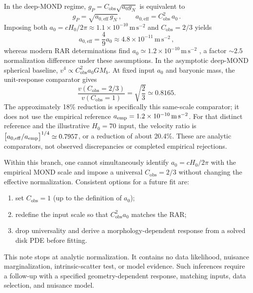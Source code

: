 \documentclass[aps,prd,reprint,superscriptaddress,nofootinbib,floatfix,showkeys]{revtex4-2}
\newcommand{\Cobs}{C_{\mathrm{obs}}}
\newcommand{\azero}{a_{0}}
\newcommand{\Hzero}{H_{0}}
\begin{document}
In the deep-MOND regime, \(g_{P}=\Cobs\sqrt{\azero g_{N}}\) is equivalent to
\begin{equation}
  g_{P}=\sqrt{a_{0,\mathrm{eff}}\,g_{N}}\,,
  \qquad
  a_{0,\mathrm{eff}} = \Cobs^{2}\,\azero\,.
  \label{eq:a0eff}
\end{equation}
Imposing both \(\azero=c\Hzero/2\pi\approx 1.1\times 10^{-10}\,\mathrm{m\,s^{-2}}\)
and \(\Cobs=2/3\) yields
\begin{equation}
  a_{0,\mathrm{eff}} = \frac{4}{9}\azero
  \approx 4.8\times 10^{-11}\,\mathrm{m\,s^{-2}}\,,
  \label{eq:a0eff-num}
\end{equation}
whereas modern RAR determinations find
\(a_0\simeq 1.2\times 10^{-10}\,\mathrm{m\,s^{-2}}\)
\cite{mcgaugh_rar,lelli_rar}, a factor \(\sim 2.5\) normalization difference
under these assumptions.
In the asymptotic deep-MOND spherical baseline,
\(v^{4}\propto \Cobs^{2}\azero GM_{b}\). At fixed input \(\azero\) and
baryonic mass, the unit-response comparator gives
\begin{equation}
 \frac{v(\Cobs=2/3)}{v(\Cobs=1)}
 =\sqrt{\frac{2}{3}}\simeq0.8165.
 \label{eq:velocity-comparator}
\end{equation}
The approximately 18\% reduction is specifically this same-scale comparator;
it does not use the empirical reference
\(a_{\rm emp}=1.2\times10^{-10}\,\mathrm{m\,s^{-2}}\). For that distinct
reference and the illustrative \(\Hzero=70\) input, the velocity ratio is
\(\bigl[a_{0,\mathrm{eff}}/a_{\rm emp}\bigr]^{1/4}\simeq0.7957\), or a
reduction of about 20.4\%. These are analytic comparators, not observed
discrepancies or completed empirical rejections.

Within this branch, one cannot simultaneously identify
\(\azero=c\Hzero/2\pi\) with the empirical MOND scale and impose a universal
\(\Cobs=2/3\) without changing the effective normalization.  Consistent
options for a future fit are:
\begin{enumerate}
\item set \(\Cobs=1\) (up to the definition of \(\azero\));
\item redefine the input scale so that \(\Cobs^{2}\azero\) matches the RAR;
\item drop universality and derive a morphology-dependent response from a
  solved disk PDE before fitting.
\end{enumerate}

This note stops at analytic normalization. It contains no data likelihood,
nuisance marginalization, intrinsic-scatter test, or model evidence. Such
inferences require a follow-up with a specified geometry-dependent response,
matching inputs, data selection, and nuisance model.
\end{document}

